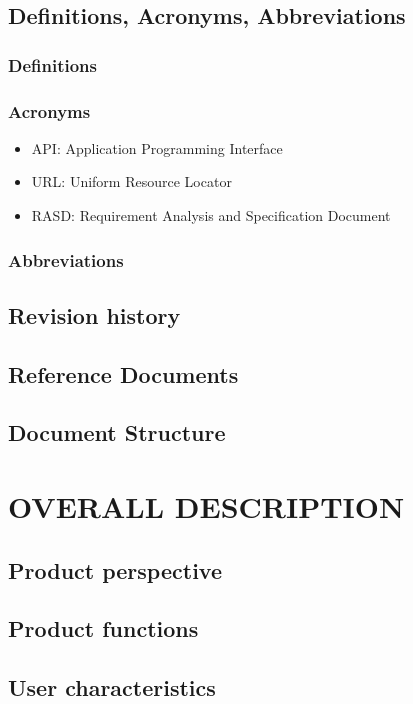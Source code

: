 \documentclass{article}
\begin{document}
\subsection{Definitions, Acronyms, Abbreviations}
\subsubsection{Definitions}
\subsubsection{Acronyms}
\begin{itemize}
\item API: Application Programming Interface
\item URL: Uniform Resource Locator
\item RASD:  Requirement Analysis and Specification Document 
\end{itemize}
\subsubsection{Abbreviations}

\subsection{Revision history}
\subsection{Reference Documents}
\subsection{Document Structure}

\section{OVERALL DESCRIPTION}

\subsection{Product perspective}
\subsection{Product functions}
\subsection{User characteristics}
\end{document}
